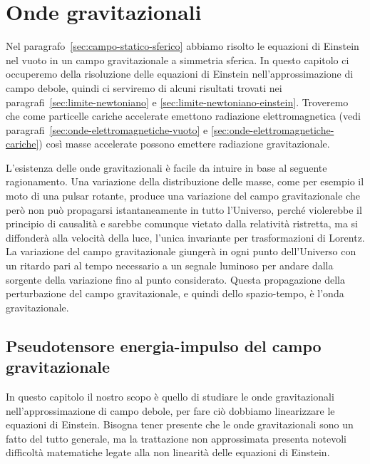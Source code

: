\chapter{Onde gravitazionali}
\label{cha:onde-grav}

Nel paragrafo~\ref{sec:campo-statico-sferico} abbiamo risolto le equazioni di
Einstein nel vuoto in un campo gravitazionale a simmetria sferica.  In questo
capitolo ci occuperemo della risoluzione delle equazioni di Einstein
nell'approssimazione di campo debole, quindi ci serviremo di alcuni risultati
trovati nei paragrafi~\ref{sec:limite-newtoniano} e
\ref{sec:limite-newtoniano-einstein}.  Troveremo che come particelle cariche
accelerate emettono radiazione elettromagnetica (vedi
paragrafi~\ref{sec:onde-elettromagnetiche-vuoto} e
\ref{sec:onde-elettromagnetiche-cariche}) così masse accelerate possono emettere
radiazione gravitazionale.

L'esistenza delle onde gravitazionali è facile da intuire in base al seguente
ragionamento.  Una variazione della distribuzione delle masse, come per esempio
il moto di una pulsar rotante, produce una variazione del campo gravitazionale
che però non può propagarsi istantaneamente in tutto l'Universo, perché
violerebbe il principio di causalità e sarebbe comunque vietato dalla relatività
ristretta, ma si diffonderà alla velocità della luce, l'unica invariante per
trasformazioni di Lorentz.  La variazione del campo gravitazionale giungerà in
ogni punto dell'Universo con un ritardo pari al tempo necessario a un segnale
luminoso per andare dalla sorgente della variazione fino al punto considerato.
Questa propagazione della perturbazione del campo gravitazionale, e quindi dello
spazio-tempo, è l'onda gravitazionale.

\section{Pseudotensore energia-impulso del campo gravitazionale}
\label{sec:energ-impulso-grav}

In questo capitolo il nostro scopo è quello di studiare le onde gravitazionali
nell'approssimazione di campo debole, per fare ciò dobbiamo linearizzare le
equazioni di Einstein.  Bisogna tener presente che le onde gravitazionali sono
un fatto del tutto generale, ma la trattazione non approssimata presenta
notevoli difficoltà matematiche legate alla non linearità delle equazioni di
Einstein.

